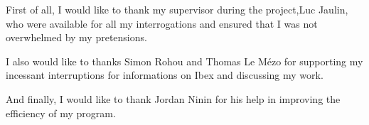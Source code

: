 
First of all, I would like to thank my supervisor during the project,Luc Jaulin, who were available for all my interrogations and ensured that I was not overwhelmed by my pretensions.

I also would like to thanks Simon Rohou and Thomas Le Mézo for supporting my incessant interruptions for informations on Ibex and discussing my  work.

And finally, I would like to thank Jordan Ninin for his help in improving the efficiency of my program.